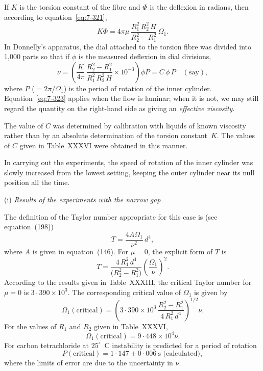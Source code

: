 If $K$ is the torsion constant of the fibre and $\Phi$ is the deflexion in radians,
then according to equation~\eqref{eq:7-321},
\begin{equation}\label{eq:7-322}
K\Phi = 4\pi\mu\,\frac{R_1^2\,R_2^2\,H}{R_2^2 - R_1^2}\,\Omega_1.
\end{equation}
In Donnelly's apparatus, the dial attached to the torsion fibre was
divided into 1,000 parts so that if $\phi$ is the measured deflexion in dial
divisions,
\begin{equation}\label{eq:7-323}
\nu = \left(\frac{K}{4\pi}\,\frac{R_2^2 - R_1^2}{R_1^2\,R_2^2\,H} \times 10^{-3}\right)\phi P
= C\,\phi\,P \quad (\text{say}),
\end{equation}
where $P$ ($= 2\pi/\Omega_1$) is the period of rotation of the inner cylinder.
Equation~\eqref{eq:7-323} applies when the flow is laminar; when it is not, we may
still regard the quantity on the right-hand side as giving an \textit{effective
viscosity}.

The value of $C$ was determined by calibration with liquids of known
viscosity rather than by an absolute determination of the torsion
constant~$K$.  The values of $C$ given in Table~XXXVI were obtained in
this manner.

In carrying out the experiments, the speed of rotation of the inner
cylinder was slowly increased from the lowest setting, keeping the
outer cylinder near its null position all the time.

\medskip
\noindent (i) \textit{Results of the experiments with the narrow gap}

The definition of the Taylor number appropriate for this case is (see
equation~(198))
\begin{equation}\label{eq:7-324}
T = \frac{4A\Omega_1}{\nu^2}\,d^4,
\end{equation}
where $A$ is given in equation~(146).  For $\mu = 0$, the explicit form of $T$ is
\begin{equation}\label{eq:7-325}
T = \frac{4\,R_1^2\,d^4}{\bigl(R_2^2 - R_1^2\bigr)}\left(\frac{\Omega_1}{\nu}\right)^{\!2}.
\end{equation}
According to the results given in Table~XXXIII, the critical Taylor
number for $\mu = 0$ is $3{\cdot}390 \times 10^3$.  The corresponding critical value of $\Omega_1$
is given by
\begin{equation}\label{eq:7-326}
\Omega_1(\text{critical}) = \left(3{\cdot}390 \times 10^3\,\frac{R_2^2 - R_1^2}{4\,R_1^2\,d^4}\right)^{1/2}\!\nu.
\end{equation}
For the values of $R_1$ and $R_2$ given in Table~XXXVI,
\begin{equation}\label{eq:7-327}
\Omega_1(\text{critical}) = 9{\cdot}448 \times 10^4 \nu.
\end{equation}
For carbon tetrachloride at $25^{\circ}$~C instability is predicted for a period of
rotation
\begin{equation}\label{eq:7-328}
P(\text{critical}) = 1{\cdot}147 \pm 0{\cdot}006~\text{s (calculated)},
\end{equation}
where the limits of error are due to the uncertainty in $\nu$.

